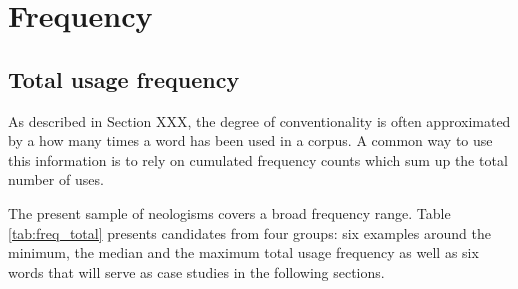 \documentclass[draft, a4paper, abstract=on]{scrartcl}
\begin{document}
\section{Frequency}

  \subsection{Total usage frequency}

  As described in Section XXX, the degree of conventionality is often approximated by a how many times a word has been used in a corpus. A common way to use this information is to rely on cumulated frequency counts which sum up the total number of uses.

  The present sample of neologisms covers a broad frequency range. Table \ref{tab:freq_total} presents candidates from four groups: six examples around the minimum, the median and the maximum total usage frequency as well as six words that will serve as case studies in the following sections.
\end{document}
